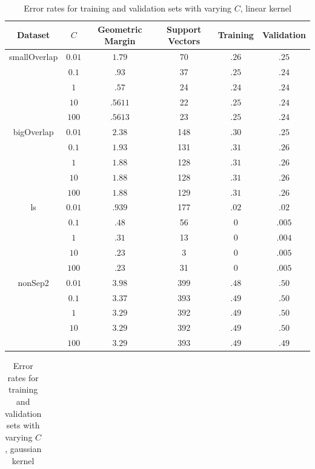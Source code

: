 \documentclass[10pt]{article}
\begin{document}
\begin{table}
\centering
\begin{tabular}{c|c|c|c|c|c}
Dataset 	 &	 $C$  & Geometric Margin & Support Vectors & Training & Validation \\ \hline
smallOverlap & $0.01$ 	& $1.79$		& 70 		& $.26$ & $.25$ \\
			& $0.1$		& $.93$			& 37		& $.25$ & $.24$ \\
			& $1$		& $.57$			& 24		& $.24$ & $.24$ \\
			& $10$		& $.5611$		& 22 		& $.25$ & $.24$ \\
			& $100$ 	& $.5613$		& 23		& $.25$ & $.24$ \\
bigOverlap & $0.01$ 	& $2.38$		& 148 		& $.30$ & $.25$ \\
			& $0.1$		& $1.93$		& 131		& $.31$ & $.26$ \\
			& $1$		& $1.88$		& 128		& $.31$ & $.26$ \\
			& $10$		& $1.88$		& 128 		& $.31$ & $.26$ \\
			& $100$ 	& $1.88$		& 129		& $.31$ & $.26$ \\
ls 			& $0.01$ 	& $.939$		& 177		& $.02$ & $.02$ \\
			& $0.1$		& $.48 $		& 56		& $0  $ & $.005$ \\
			& $1$		& $.31$	 		& 13		& $0  $ & $.004$ \\
			& $10$		& $.23$			& 3 		& $0 $ & $.005$ \\
			& $100$ 	& $.23$			& 31		& $0 $ & $.005$ \\
nonSep2 	& $0.01$ 	& $3.98$		& 399 		& $.48$ & $.50$ \\
			& $0.1$		& $3.37$		& 393		& $.49$ & $.50$ \\
			& $1$		& $3.29$		& 392		& $.49$ & $.50$ \\
			& $10$		& $3.29$		& 392		& $.49$ & $.50$ \\
			& $100$ 	& $3.29$		& 393		& $.49$ & $.49$ \\
\end{tabular}
\caption{Error rates for training and validation sets with varying $C$, linear kernel}
\label{tbl:1-3-linear}
\end{table}


\begin{table}
\centering
\begin{tabular}{c|c|c|c}

\end{tabular}
\caption{Error rates for training and validation sets with varying $C$, gaussian kernel}
\label{tbl:1-3-gaussian}
\end{table}
\end{document}

